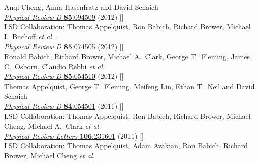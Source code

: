 \begin{spacelist}
\begin{revnumerate}
      Anqi Cheng, Anna Hasenfratz and David Schaich \\
      \href{https://doi.org/10.1103/PhysRevD.85.094509}{\textit{Physical Review D} \textbf{85}:094509} (2012) []
    \pagebreakitem
       \\
      LSD Collaboration: Thomas Appelquist, Ron Babich, Richard Brower, Michael I.~Buchoff \textit{et al.} \\ %
      \href{https://doi.org/10.1103/PhysRevD.85.074505}{\textit{Physical Review D} \textbf{85}:074505} (2012) []
    \pagebreakitem
       \\
      Ronald Babich, Richard Brower, Michael A.~Clark, George T.~Fleming, James C.~Osborn, Claudio Rebbi \textit{et al.} \\ %
      \href{https://doi.org/10.1103/PhysRevD.85.054510}{\textit{Physical Review D} \textbf{85}:054510} (2012) []
    \pagebreakitem
       \\
      Thomas Appelquist, George T.~Fleming, Meifeng Lin, Ethan T.~Neil and David Schaich \\
      \href{https://doi.org/10.1103/PhysRevD.84.054501}{\textit{Physical Review D} \textbf{84}:054501} (2011) []
    \pagebreakitem
       \\
      LSD Collaboration: Thomas Appelquist, Ron Babich, Richard Brower, Michael Cheng, Michael A.~Clark \textit{et al.} \\ %
      \href{https://doi.org/10.1103/PhysRevLett.106.231601}{\textit{Physical Review Letters} \textbf{106}:231601} (2011) []
    \pagebreakitem
       \\
      LSD Collaboration: Thomas Appelquist, Adam Avakian, Ron Babich, Richard Brower, Michael Cheng \textit{et al.} \\ %

\end{revnumerate}
\end{spacelist}
